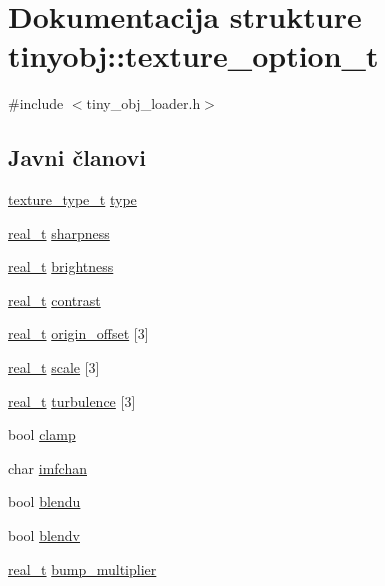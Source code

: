 \hypertarget{structtinyobj_1_1texture__option__t}{}\section{Dokumentacija strukture tinyobj\+:\+:texture\+\_\+option\+\_\+t}
\label{structtinyobj_1_1texture__option__t}


{\ttfamily \#include $<$tiny\+\_\+obj\+\_\+loader.\+h$>$}

\subsection*{Javni članovi}
\begin{DoxyCompactItemize}
\item 
\hyperlink{namespacetinyobj_a5c9f207e1f880a48bac0a3b69f16d7f8}{texture\+\_\+type\+\_\+t} \hyperlink{structtinyobj_1_1texture__option__t_ae93ebf5f70b1b3e3c1de58a257157e00}{type}
\item 
\hyperlink{namespacetinyobj_ad5ca7469ff56bf0d8423120cfd99adce}{real\+\_\+t} \hyperlink{structtinyobj_1_1texture__option__t_a047615e368808b85d5a9cd740ff05846}{sharpness}
\item 
\hyperlink{namespacetinyobj_ad5ca7469ff56bf0d8423120cfd99adce}{real\+\_\+t} \hyperlink{structtinyobj_1_1texture__option__t_a4aea70d3ffbaa6b439db7447557cbab2}{brightness}
\item 
\hyperlink{namespacetinyobj_ad5ca7469ff56bf0d8423120cfd99adce}{real\+\_\+t} \hyperlink{structtinyobj_1_1texture__option__t_a3b81d1c299840825e6633c00ba9ee0e3}{contrast}
\item 
\hyperlink{namespacetinyobj_ad5ca7469ff56bf0d8423120cfd99adce}{real\+\_\+t} \hyperlink{structtinyobj_1_1texture__option__t_ab6a036a11f7b1317709a4d3e25495e07}{origin\+\_\+offset} \mbox{[}3\mbox{]}
\item 
\hyperlink{namespacetinyobj_ad5ca7469ff56bf0d8423120cfd99adce}{real\+\_\+t} \hyperlink{structtinyobj_1_1texture__option__t_a821b861e21a282c14ab702e45ac137dd}{scale} \mbox{[}3\mbox{]}
\item 
\hyperlink{namespacetinyobj_ad5ca7469ff56bf0d8423120cfd99adce}{real\+\_\+t} \hyperlink{structtinyobj_1_1texture__option__t_a39e0e7cb38178022522df240d31709ec}{turbulence} \mbox{[}3\mbox{]}
\item 
bool \hyperlink{structtinyobj_1_1texture__option__t_a55c0ce8fec97910a43606281ea7ee122}{clamp}
\item 
char \hyperlink{structtinyobj_1_1texture__option__t_a2ea1261e85ce71e4f7bacd508a623b65}{imfchan}
\item 
bool \hyperlink{structtinyobj_1_1texture__option__t_a6114c2757e6dd4a4929623797a098d25}{blendu}
\item 
bool \hyperlink{structtinyobj_1_1texture__option__t_a828008c248d350f8d18c04295c773a9c}{blendv}
\item 
\hyperlink{namespacetinyobj_ad5ca7469ff56bf0d8423120cfd99adce}{real\+\_\+t} \hyperlink{structtinyobj_1_1texture__option__t_ad2e2c79e305189e5d146992c32248d49}{bump\+\_\+multiplier}
\end{DoxyCompactItemize}


